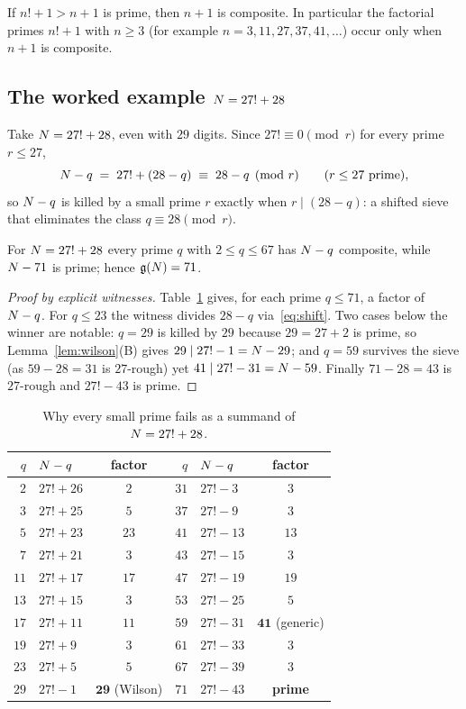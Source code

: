 \begin{corollary}\label{cor:facprime}
If $n!+1>n+1$ is prime, then $n+1$ is composite. In particular the
factorial primes $n!+1$ with $n\ge3$ (for example $n=3,11,27,37,41,\dots$)
occur only when $n+1$ is composite.
\end{corollary}

\subsection{The worked example \texorpdfstring{$N=27!+28$}{N=27!+28}}

Take $N=27!+28$, even with $29$ digits. Since $27!\equiv0\pmod r$ for
every prime $r\le27$,
\begin{equation}\label{eq:shift}
\N-q\;=\;27!+(28-q)\;\equiv\;28-q\pmod r\qquad(r\le27\ \text{prime}),
\end{equation}
so $N-q$ is killed by a small prime $r$ exactly when $r\mid(28-q)$: a
shifted sieve that eliminates the class $q\equiv28\pmod r$.

\begin{proposition}\label{prop:71}
For $N=27!+28$ every prime $q$ with $2\le q\le67$ has $N-q$ composite,
while $N-71$ is prime; hence $\mathfrak{g}(N)=71$.
\end{proposition}
\begin{proof}[Proof by explicit witnesses]
Table~\ref{tab:witness} gives, for each prime $q\le71$, a factor of
$N-q$. For $q\le23$ the witness divides $28-q$ via~\eqref{eq:shift}.
Two cases below the winner are notable: $q=29$ is killed by $29$ because
$29=27+2$ is prime, so Lemma~\ref{lem:wilson}(B) gives
$29\mid27!-1=N-29$; and $q=59$ survives the sieve (as $59-28=31$ is
$27$-rough) yet $41\mid27!-31=N-59$. Finally $71-28=43$ is $27$-rough
and $27!-43$ is prime.
\end{proof}

\begin{table}[h]
\centering\small
\caption{Why every small prime fails as a summand of $N=27!+28$.}\label{tab:witness}
\begin{tabular}{rlc@{\qquad}rlc}
\toprule
$q$ & $N-q$ & factor & $q$ & $N-q$ & factor\\
\midrule
$2$&$27!+26$&$2$ & $31$&$27!-3$&$3$\\
$3$&$27!+25$&$5$ & $37$&$27!-9$&$3$\\
$5$&$27!+23$&$23$ & $41$&$27!-13$&$13$\\
$7$&$27!+21$&$3$ & $43$&$27!-15$&$3$\\
$11$&$27!+17$&$17$ & $47$&$27!-19$&$19$\\
$13$&$27!+15$&$3$ & $53$&$27!-25$&$5$\\
$17$&$27!+11$&$11$ & $59$&$27!-31$&$\mathbf{41}$ (generic)\\
$19$&$27!+9$&$3$ & $61$&$27!-33$&$3$\\
$23$&$27!+5$&$5$ & $67$&$27!-39$&$3$\\
$29$&$27!-1$&$\mathbf{29}$ (Wilson) & $71$&$27!-43$&\textbf{prime}\\
\bottomrule
\end{tabular}
\end{table}

